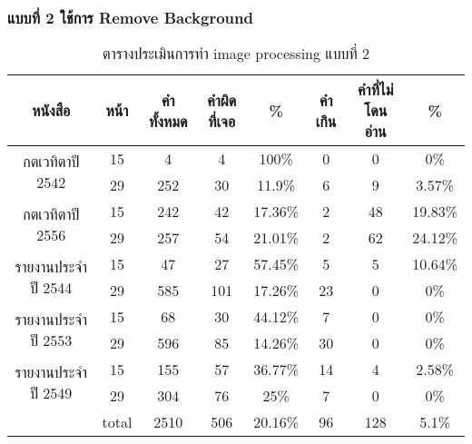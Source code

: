 \subsubsection{แบบที่ 2 ใช้การ Remove Background}

\begin{table}[H]
    \caption{ตารางประเมินการทำ image processing แบบที่ 2}\label{tbl:imagep2}
        \begin{tabular}{|c|c|c|c|c|c|c|c|}
            \hline
            หนังสือ                             & หน้า                       & คำทั้งหมด & คำผิดที่เจอ & \%    & คำเกิน & คำที่ไม่โดนอ่าน & \%    \\ \hline
            \multirow{2}{*}{กตเวทิตาปี 2542}    & 15                         & 4         & 4           & 100\%   & 0      & 0               & 0\%     \\ \cline{2-8} 
                                                & 29                         & 252       & 30          & 11.9\%  & 6      & 9               & 3.57\%  \\ \hline
            \multirow{2}{*}{กตเวทิตาปี 2556}    & 15                         & 242       & 42          & 17.36\% & 2      & 48              & 19.83\% \\ \cline{2-8} 
                                                & 29                         & 257       & 54          & 21.01\% & 2      & 62              & 24.12\% \\ \hline
            \multirow{2}{*}{รายงานประจำปี 2544} & 15                         & 47        & 27          & 57.45\% & 5      & 5               & 10.64\% \\ \cline{2-8} 
                                                & 29                         & 585       & 101         & 17.26\% & 23     & 0               & 0\%     \\ \hline
            \multirow{2}{*}{รายงานประจำปี 2553} & 15                         & 68        & 30          & 44.12\% & 7      & 0               & 0\%     \\ \cline{2-8} 
                                                & 29                         & 596       & 85          & 14.26\% & 30     & 0               & 0\%     \\ \hline
            \multirow{2}{*}{รายงานประจำปี 2549} & 15                         & 155       & 57          & 36.77\% & 14     & 4               & 2.58\%  \\ \cline{2-8} 
                                                & 29                         & 304       & 76          & 25\%    & 7      & 0               & 0\%     \\ \hline
            \multicolumn{1}{|l|}{}              & \multicolumn{1}{l|}{total} & 2510      & 506         & 20.16\% & 96     & 128             & 5.1\%   \\ \hline
            \end{tabular}
            \end{table}

